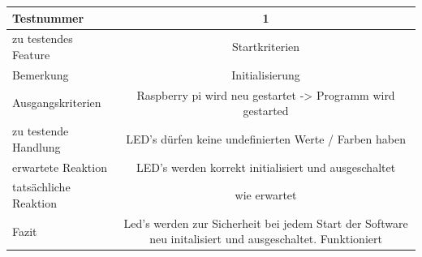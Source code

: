 \documentclass[]{article}
\begin{document}
\begin{longtable}[]{@{}lc@{}}
\toprule
\begin{minipage}[b]{0.25\columnwidth}\raggedright\strut
Testnummer\strut
\end{minipage} & \begin{minipage}[b]{0.55\columnwidth}\centering\strut
1\strut
\end{minipage}\tabularnewline
\midrule
\endhead
\begin{minipage}[t]{0.25\columnwidth}\raggedright\strut
zu testendes Feature\strut
\end{minipage} & \begin{minipage}[t]{0.55\columnwidth}\centering\strut
Startkriterien\strut
\end{minipage}\tabularnewline
\begin{minipage}[t]{0.25\columnwidth}\raggedright\strut
Bemerkung\strut
\end{minipage} & \begin{minipage}[t]{0.55\columnwidth}\centering\strut
Initialisierung\strut
\end{minipage}\tabularnewline
\begin{minipage}[t]{0.25\columnwidth}\raggedright\strut
Ausgangskriterien\strut
\end{minipage} & \begin{minipage}[t]{0.55\columnwidth}\centering\strut
Raspberry pi wird neu gestartet -\textgreater{} Programm wird
gestarted\strut
\end{minipage}\tabularnewline
\begin{minipage}[t]{0.25\columnwidth}\raggedright\strut
zu testende Handlung\strut
\end{minipage} & \begin{minipage}[t]{0.55\columnwidth}\centering\strut
LED's dürfen keine undefinierten Werte / Farben haben\strut
\end{minipage}\tabularnewline
\begin{minipage}[t]{0.25\columnwidth}\raggedright\strut
erwartete Reaktion\strut
\end{minipage} & \begin{minipage}[t]{0.55\columnwidth}\centering\strut
LED's werden korrekt initialisiert und ausgeschaltet\strut
\end{minipage}\tabularnewline
\begin{minipage}[t]{0.25\columnwidth}\raggedright\strut
tatsächliche Reaktion\strut
\end{minipage} & \begin{minipage}[t]{0.55\columnwidth}\centering\strut
wie erwartet\strut
\end{minipage}\tabularnewline
\begin{minipage}[t]{0.25\columnwidth}\raggedright\strut
Fazit\strut
\end{minipage} & \begin{minipage}[t]{0.55\columnwidth}\centering\strut
Led's werden zur Sicherheit bei jedem Start der Software neu
initalisiert und ausgeschaltet. Funktioniert\strut
\end{minipage}\tabularnewline
\bottomrule
\end{longtable}
\end{document}

